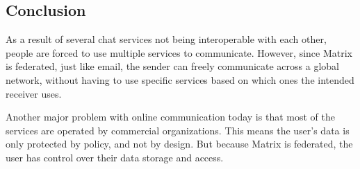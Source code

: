 \subsection{Conclusion}

As a result of several chat services not being interoperable with each other, people are 
forced to use multiple services to communicate.
However, since Matrix is federated, just like email, the sender can freely communicate across a 
global network, without having to use specific services based on which ones the intended receiver uses.

Another major problem with online communication today is that most of the services 
are operated by commercial organizations. This means the user's data is only protected by policy, and not by design.
But because Matrix is federated, the user has control over their data storage and access.~\cite{RumaWhyMatrix}
